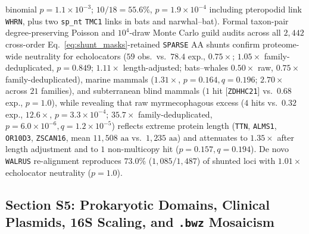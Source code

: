 \documentclass[12pt]{article}
\begin{document}
binomial $p = 1.1\times 10^{-3}$; $10/18 = 55.6\%$, $p = 1.9\times 10^{-4}$ including pteropodid link \texttt{WHRN}, plus two \texttt{sp\_nt} \texttt{TMC1} links in bats and narwhal--bat). Formal taxon-pair degree-preserving Poisson and $10^4$-draw Monte Carlo guild audits across all $2,442$ cross-order Eq.~\eqref{eq:shunt_masks}-retained \texttt{SPARSE} AA shunts confirm proteome-wide neutrality for echolocators ($59$ obs.\ vs.\ $78.4$ exp., $0.75\times$; $1.05\times$ family-deduplicated, $p = 0.849$; $1.11\times$ length-adjusted; bats--whales $0.50\times$ raw, $0.75\times$ family-deduplicated), marine mammals ($1.31\times$, $p = 0.164, q = 0.196$; $2.70\times$ across $21$ families), and subterranean blind mammals ($1$ hit [\texttt{ZDHHC21}] vs.\ $0.68$ exp., $p = 1.0$), while revealing that raw myrmecophagous excess ($4$ hits vs.\ $0.32$ exp., $12.6\times$, $p = 3.3\times 10^{-4}$; $35.7\times$ family-deduplicated, $p = 6.0\times 10^{-6}, q = 1.2\times 10^{-5}$) reflects extreme protein length (\texttt{TTN}, \texttt{ALMS1}, \texttt{OR10D3}, \texttt{ZSCAN16}, mean $11,508\text{ aa}$ vs.\ $1,235\text{ aa}$) and attenuates to $1.35\times$ after length adjustment and to $1$ non-multicopy hit ($p = 0.157, q = 0.194$). De novo \texttt{WALRUS} re-alignment reproduces $73.0\%$ ($1,085/1,487$) of shunted loci with $1.01\times$ echolocator neutrality ($p = 1.0$).

\subsection*{Section S5: Prokaryotic Domains, Clinical Plasmids, 16S Scaling, and \texttt{.bwz} Mosaicism}
\end{document}
